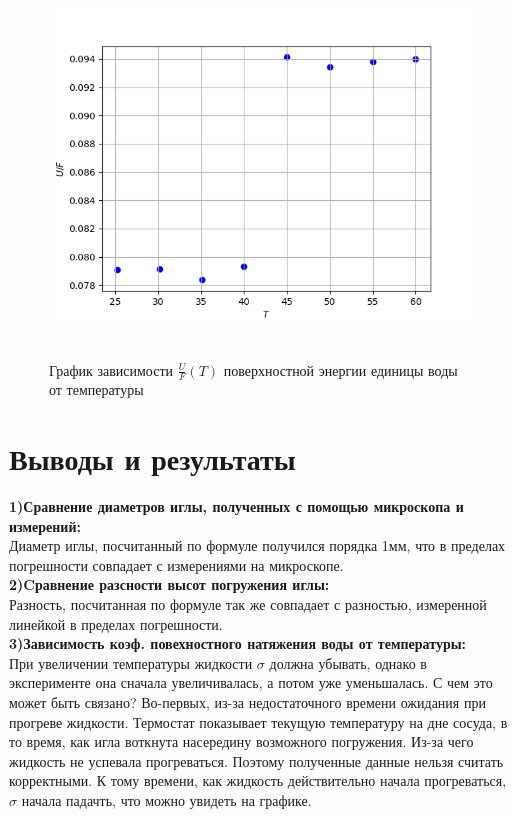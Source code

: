 \begin{figure}[h!]
    \centering 
    \includegraphics[height=10cm]{plot3.png} 
    \caption{График зависимости $\frac{U}{F} (T)$ поверхностной 
            энергии единицы воды от температуры} 
    \label{fig:uT} 
\end{figure} 

\section*{Выводы и результаты}
\textbf{1)Сравнение диаметров иглы, полученных с помощью микроскопа и измерений:}\\
Диаметр иглы, посчитанный по формуле получился порядка 1мм, что в пределах погрешности
совпадает с измерениями на микроскопе. \\
\textbf{2)Cравнение разсности высот погружения иглы:}\\ 
Разность, посчитанная по формуле так же совпадает с разностью, измеренной линейкой 
в пределах погрешности. \\
\textbf{3)Зависимость коэф. повехностного натяжения воды от температуры:}\\ 
При увеличении температуры жидкости $\sigma$ должна убывать, однако в эксперименте она
сначала увеличивалась, а потом уже уменьшалась. С чем это может быть связано? 
Во-первых, из-за недостаточного времени ожидания при прогреве жидкости. Термостат показывает
текущую температуру на дне сосуда, в то время, как игла воткнута насередину возможного
погружения. Из-за чего жидкость не успевала прогреваться. Поэтому полученные данные 
нельзя считать корректными. К тому времени, как жидкость действительно начала 
прогреваться, $\sigma$ начала падачть, что можно увидеть на графике. 


